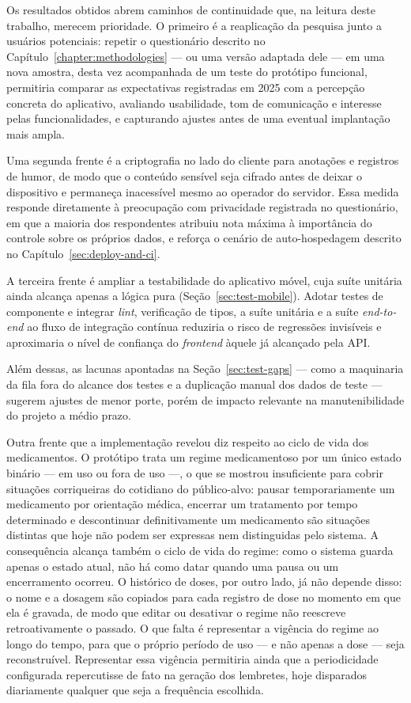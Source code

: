 Os resultados obtidos abrem caminhos de continuidade que, na leitura deste
trabalho, merecem prioridade. O primeiro é a reaplicação da pesquisa junto a
usuários potenciais: repetir o questionário descrito no
Capítulo~\ref{chapter:methodologies} --- ou uma versão adaptada dele --- em uma
nova amostra, desta vez acompanhada de um teste do protótipo funcional,
permitiria comparar as expectativas registradas em 2025 com a percepção
concreta do aplicativo, avaliando usabilidade, tom de comunicação e interesse
pelas funcionalidades, e capturando ajustes antes de uma eventual implantação
mais ampla.

Uma segunda frente é a criptografia no lado do cliente para anotações e
registros de humor, de modo que o conteúdo sensível seja cifrado antes de
deixar o dispositivo e permaneça inacessível mesmo ao operador do servidor.
Essa medida responde diretamente à preocupação com privacidade registrada no
questionário, em que a maioria dos respondentes atribuiu nota máxima à
importância do controle sobre os próprios dados, e reforça o cenário de
auto-hospedagem descrito no Capítulo~\ref{sec:deploy-and-ci}.

A terceira frente é ampliar a testabilidade do aplicativo móvel, cuja suíte
unitária ainda alcança apenas a lógica pura (Seção~\ref{sec:test-mobile}).
Adotar testes de componente e integrar \textit{lint}, verificação de tipos, a
suíte unitária e a suíte \textit{end-to-end} ao fluxo de integração contínua
reduziria o risco de regressões invisíveis e aproximaria o nível de confiança do
\textit{frontend} àquele já alcançado pela API.

Além dessas, as lacunas apontadas na Seção~\ref{sec:test-gaps} --- como a
maquinaria da fila fora do alcance dos testes e a duplicação manual dos dados
de teste --- sugerem ajustes de menor porte, porém de impacto relevante na
manutenibilidade do projeto a médio prazo.

Outra frente que a implementação revelou diz respeito ao ciclo de vida dos
medicamentos. O protótipo trata um regime medicamentoso por um único estado
binário --- em uso ou fora de uso ---, o que se mostrou insuficiente para cobrir
situações corriqueiras do cotidiano do público-alvo: pausar temporariamente um
medicamento por orientação médica, encerrar um tratamento por tempo determinado
e descontinuar definitivamente um medicamento são situações distintas que hoje
não podem ser expressas nem distinguidas pelo sistema. A consequência
alcança também o ciclo de vida do regime: como o sistema guarda apenas o
estado atual, não há como datar quando uma pausa ou um encerramento
ocorreu. O histórico de doses, por outro lado, já não depende disso: o nome
e a dosagem são copiados para cada registro de dose no momento em que ela é
gravada, de modo que editar ou desativar o regime não reescreve
retroativamente o passado. O que falta é representar a vigência do regime
ao longo do tempo, para que o próprio período de uso --- e não apenas a
dose --- seja reconstruível. Representar essa vigência permitiria ainda que a
periodicidade configurada repercutisse de fato na geração dos lembretes, hoje
disparados diariamente qualquer que seja a frequência escolhida.

